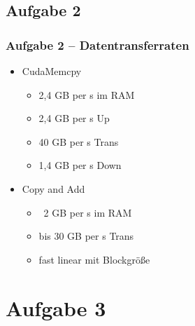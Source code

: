 \documentclass[german,notes,18pt]{beamer}
\begin{document}
	\subsection{Aufgabe 2}
	\begin{frame}
		\frametitle{Aufgabe 2 -- Datentransferraten}
		\begin{itemize}
			\item CudaMemcpy
			\begin{itemize}
				\item 2,4 GB per s im RAM
				\item 2,4 GB per s Up
				\item 40 GB per s Trans
				\item 1,4 GB per s Down
			\end{itemize}
			\item Copy and Add 
			\begin{itemize}
				\item ~2 GB per s im RAM
				\item bis 30 GB per s Trans
				\item fast linear mit Blockgröße
			\end{itemize}
		\end{itemize}
	\end{frame}

	\section{Aufgabe 3}
\end{document}
